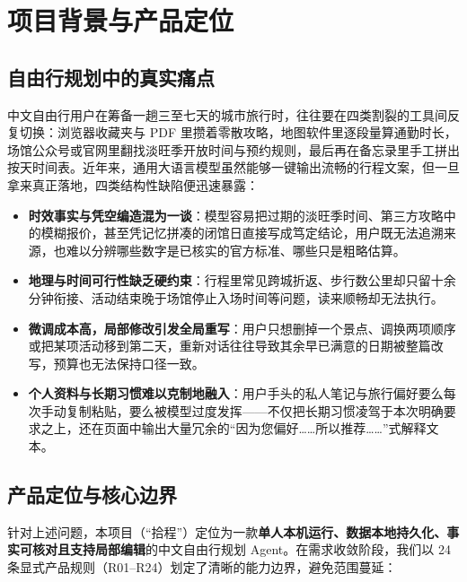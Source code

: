 \section{项目背景与产品定位}

\subsection{自由行规划中的真实痛点}

中文自由行用户在筹备一趟三至七天的城市旅行时，往往要在四类割裂的工具间反复切换：浏览器收藏夹与 PDF 里攒着零散攻略，地图软件里逐段量算通勤时长，场馆公众号或官网里翻找淡旺季开放时间与预约规则，最后再在备忘录里手工拼出按天时间表。近年来，通用大语言模型虽然能够一键输出流畅的行程文案，但一旦拿来真正落地，四类结构性缺陷便迅速暴露：

\begin{itemize}
  \item \textbf{时效事实与凭空编造混为一谈}：模型容易把过期的淡旺季时间、第三方攻略中的模糊报价，甚至凭记忆拼凑的闭馆日直接写成笃定结论，用户既无法追溯来源，也难以分辨哪些数字是已核实的官方标准、哪些只是粗略估算。
  \item \textbf{地理与时间可行性缺乏硬约束}：行程里常见跨城折返、步行数公里却只留十余分钟衔接、活动结束晚于场馆停止入场时间等问题，读来顺畅却无法执行。
  \item \textbf{微调成本高，局部修改引发全局重写}：用户只想删掉一个景点、调换两项顺序或把某项活动移到第二天，重新对话往往导致其余早已满意的日期被整篇改写，预算也无法保持口径一致。
  \item \textbf{个人资料与长期习惯难以克制地融入}：用户手头的私人笔记与旅行偏好要么每次手动复制粘贴，要么被模型过度发挥——不仅把长期习惯凌驾于本次明确要求之上，还在页面中输出大量冗余的“因为您偏好……所以推荐……”式解释文本。
\end{itemize}

\subsection{产品定位与核心边界}

针对上述问题，本项目（“拾程”）定位为一款\textbf{单人本机运行、数据本地持久化、事实可核对且支持局部编辑}的中文自由行规划 Agent。在需求收敛阶段，我们以 24 条显式产品规则（R01--R24）划定了清晰的能力边界，避免范围蔓延：

